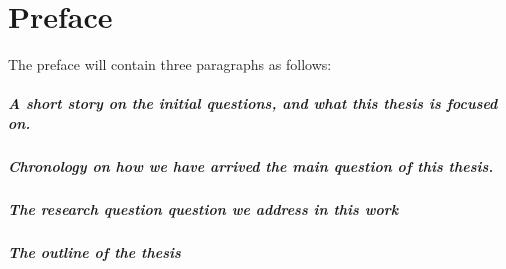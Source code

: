 \chapter{Preface}
The preface will contain three paragraphs as follows: 

\paragraph{A short story on the initial questions, and what this thesis is focused on.}
 

\paragraph{Chronology on how we have arrived the main question of this thesis.}

\paragraph{The research question  question we address in this work}

\paragraph{The outline of the thesis}


